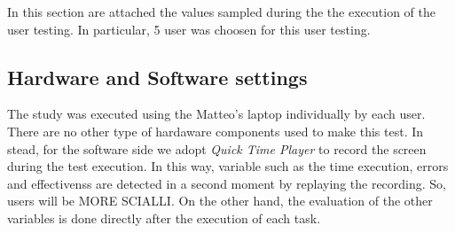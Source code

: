 In this section are attached the values sampled during the the execution of the user testing. In particular, 5 user was choosen for this user testing.

\subsection{Hardware and Software settings}
The study was executed using the Matteo's laptop individually by each user. There are no other type of hardaware components used to make this test.
In stead, for the software side we adopt \textit{Quick Time Player} to record the screen during the test execution. In this way, variable such as the time execution, errors and effectivenss are detected in a second moment by replaying the recording. So, users will be MORE SCIALLI. On the other hand, the evaluation of the other variables is done directly after the execution of each task.  